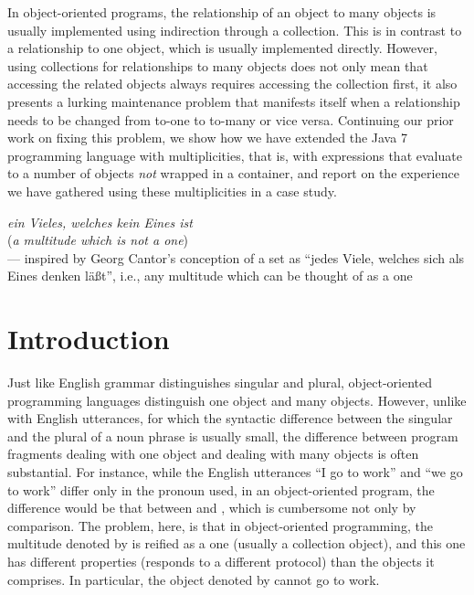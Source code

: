 {In object-oriented programs, the relationship of an object to many
objects is usually implemented using indirection through a collection. This
is in contrast to a relationship to one object, which is usually implemented
directly. However, using collections for relationships to many objects does
not only mean that accessing the related objects always requires accessing
the collection first, it also presents a lurking maintenance problem that
manifests itself when a relationship needs to be changed from to-one to
to-many or vice versa. Continuing our prior work on fixing this problem, we
show how we have extended the Java 7 programming language with
multiplicities, that is, with expressions that evaluate to a number of
objects \emph{not} wrapped in a container, and report on the experience
we have gathered using these multiplicities in a case study.

\begin{flushright}
  \emph{ein Vieles, welches kein Eines ist}\\
  (\emph{a multitude which is not a one})\\
--- inspired by Georg Cantor's conception of a set as ``jedes Viele, welches
sich als Eines denken l{\"a}{\ss}t'', i.e., any multitude which can be thought of as a
one
\end{flushright}

\section{Introduction}

\noindent Just like English grammar distinguishes singular and plural,
object-oriented programming languages distinguish one object and many
objects. However, unlike with English utterances, for which the syntactic
difference between the singular and the plural of a noun phrase is usually
small, the difference between program fragments dealing with one object and
dealing with many objects is often substantial. For instance, while the
English utterances ``I go to work'' and ``we go to work'' differ only
in the pronoun used, in an object-oriented program, the difference would be
that between  and ,
which is cumbersome not only by comparison. The problem, here, is that in
object-oriented programming, the multitude denoted by  is reified
as a one (usually a collection object), and this one has different
properties (responds to a different protocol) than the objects it comprises.
In particular, the object denoted by  cannot go to work.

}
